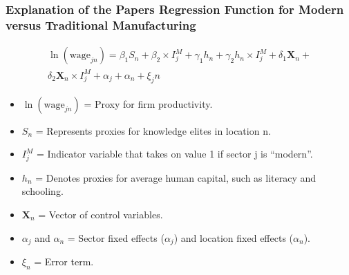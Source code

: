 \documentclass[draft=on,t,compress,11pt,xcolor=dvipsnames]{beamer}
\begin{document}
\begin{frame}
\frametitle{Explanation of the Papers Regression Function for Modern versus Traditional Manufacturing}

\begin{equation}
\begin{split}
\ln(\text{wage}_{jn}) =\beta_1 S_n+\beta_2 \times I^{M}_j+\gamma_1h_n+\gamma_2h_n \times I^{M}_j+\delta_1\boldsymbol{X}_n+\\
\delta_2\boldsymbol{X}_n \times I^{M}_j+ \alpha_j +\alpha_n +\xi_jn
\end{split}
\end{equation}

\begin{itemize}
\item $\ln(\text{wage}_{jn})$ = Proxy for firm productivity. 
\item $S_n$ = Represents  proxies for knowledge elites in location n.
\item $I^{M}_j$ = Indicator variable that takes on value 1 if sector j is  ``modern''.
\item $h_n$ = Denotes proxies for average human capital, such as literacy and schooling.
\item $\boldsymbol{X}_n$ = Vector of control variables.
\item $\alpha_j$ and $\alpha_n$ = Sector fixed effects ($\alpha_j$) and location fixed effects ($\alpha_n$).
\item$\xi_n$ = Error term.
\end{itemize}

\end{frame}
\end{document}
